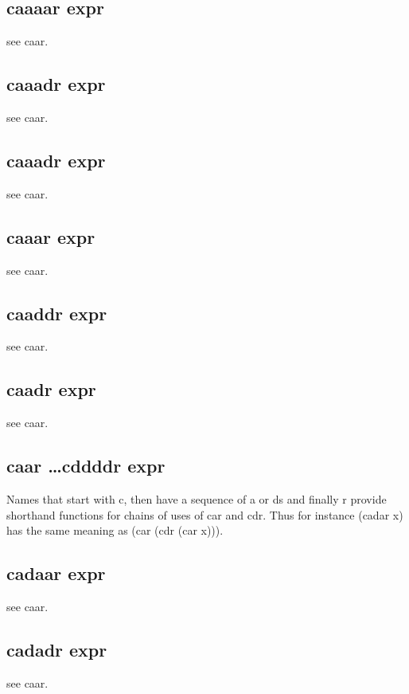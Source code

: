 \documentclass[a4paper,11pt]{article}
\begin{document}
{\subsection{\ttfamily caaaar expr}
see {\ttfamily caar}.

\subsection{\ttfamily caaadr expr}
see {\ttfamily caar}.

\subsection{\ttfamily caaadr expr}
see {\ttfamily caar}.

\subsection{\ttfamily caaar expr}
see {\ttfamily caar}.

\subsection{\ttfamily caaddr expr}
see {\ttfamily caar}.

\subsection{\ttfamily caadr expr}
see {\ttfamily caar}.

\subsection{\ttfamily caar \ldots cddddr expr}
Names that start with {\ttfamily c}, then have a sequence of
{\ttfamily a} or {\ttfamily d}s and finally {\ttfamily r} provide
shorthand functions for chains of uses of {\ttfamily car} and
{\ttfamily cdr}. Thus for instance
{\ttfamily (cadar x)} has the same meaning as
{\ttfamily (car (cdr (car x)))}.

\subsection{\ttfamily cadaar expr}
see {\ttfamily caar}.

\subsection{\ttfamily cadadr expr}
see {\ttfamily caar}.

}
\end{document}
